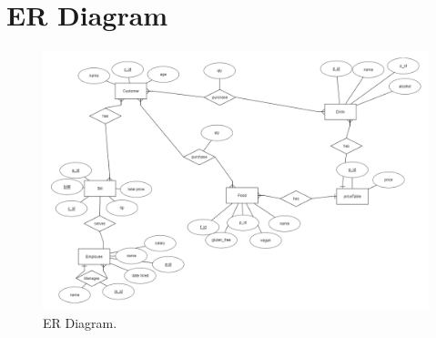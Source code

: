 \documentclass[dvips,12pt]{article}
\begin{document}
 






\FloatBarrier
\section{ER Diagram}
\begin{figure}
  \includegraphics[width=\linewidth]{er.png}
  \caption{ER Diagram.}
  \label{fig:er1}
\end{figure}
\FloatBarrier
\end{document}
